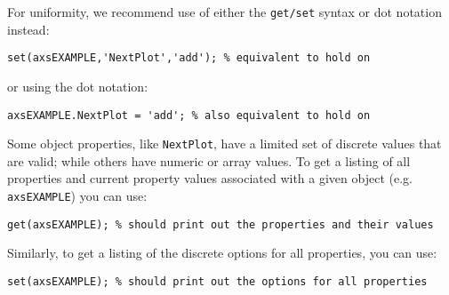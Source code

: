 \documentclass{tufte-handout}
\begin{document}
For uniformity, we recommend use of either the \lstinline{get/set} syntax or dot notation instead:
\begin{lstlisting}[style=usnaMatlab]
set(axsEXAMPLE,'NextPlot','add'); % equivalent to hold on
\end{lstlisting}
or using the dot notation:
\begin{lstlisting}[style=usnaMatlab]
axsEXAMPLE.NextPlot = 'add'; % also equivalent to hold on
\end{lstlisting}

Some object properties, like \lstinline{NextPlot}, have a limited set of discrete values that are valid; while others have numeric or array values. To get a listing of all properties and current property values associated with a given object (e.g. \lstinline{axsEXAMPLE}) you can use:
\begin{lstlisting}[style=usnaMatlab]
get(axsEXAMPLE); % should print out the properties and their values
\end{lstlisting}
Similarly, to get a listing of the discrete options for all properties, you can use:
\begin{lstlisting}[style=usnaMatlab]
set(axsEXAMPLE); % should print out the options for all properties
\end{lstlisting}
\end{document}
